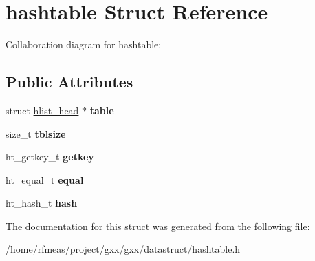 \hypertarget{structhashtable}{}\section{hashtable Struct Reference}
\label{structhashtable}


Collaboration diagram for hashtable\+:
\subsection*{Public Attributes}
\begin{DoxyCompactItemize}
\item 
struct \hyperlink{structhlist__head}{hlist\+\_\+head} $\ast$ {\bfseries table}\hypertarget{structhashtable_acae2f2c5864d12c48c531190aebe4645}{}\label{structhashtable_acae2f2c5864d12c48c531190aebe4645}

\item 
size\+\_\+t {\bfseries tblsize}\hypertarget{structhashtable_a0d77dfc93dff54482daaf4ce52a67e6e}{}\label{structhashtable_a0d77dfc93dff54482daaf4ce52a67e6e}

\item 
ht\+\_\+getkey\+\_\+t {\bfseries getkey}\hypertarget{structhashtable_ad4ec49f49c2cab4c6a49866d4db270b2}{}\label{structhashtable_ad4ec49f49c2cab4c6a49866d4db270b2}

\item 
ht\+\_\+equal\+\_\+t {\bfseries equal}\hypertarget{structhashtable_ad4ce92e4db39d31af41055480a111c7d}{}\label{structhashtable_ad4ce92e4db39d31af41055480a111c7d}

\item 
ht\+\_\+hash\+\_\+t {\bfseries hash}\hypertarget{structhashtable_ad53e7a6bc483df44b950340070c7c772}{}\label{structhashtable_ad53e7a6bc483df44b950340070c7c772}

\end{DoxyCompactItemize}


The documentation for this struct was generated from the following file\+:\begin{DoxyCompactItemize}
\item 
/home/rfmeas/project/gxx/gxx/datastruct/hashtable.\+h\end{DoxyCompactItemize}

